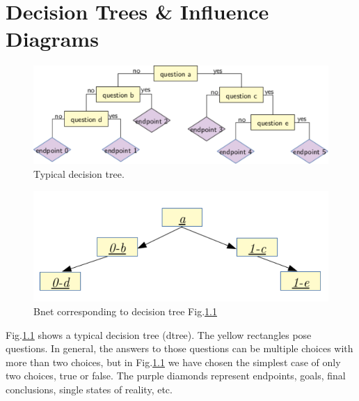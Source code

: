 \chapter{Decision Trees \& 
Influence Diagrams}

\begin{figure}[h!]
\centering
\includegraphics[width=6in]
{dtree/typical-dtree.pdf}
\caption{Typical decision tree.} 
\label{fig-typical-dtree}
\end{figure}

\begin{figure}[h!]
\centering
\includegraphics[width=5in]
{dtree/typical-dtree-bnet.pdf}
\caption{Bnet corresponding to 
decision tree
 Fig.\ref{fig-typical-dtree} }
\label{fig-typical-dtree-bnet}
\end{figure}

Fig.\ref{fig-typical-dtree}
shows a typical decision tree (dtree).
The yellow 
rectangles pose 
questions. In general,
the answers to those
questions can
be multiple choices with
more than two choices,
but in Fig.\ref{fig-typical-dtree}
we have chosen the simplest case
of only two choices, 
true or false.
The purple diamonds represent 
endpoints, goals, final
conclusions,
single states of reality, etc.


